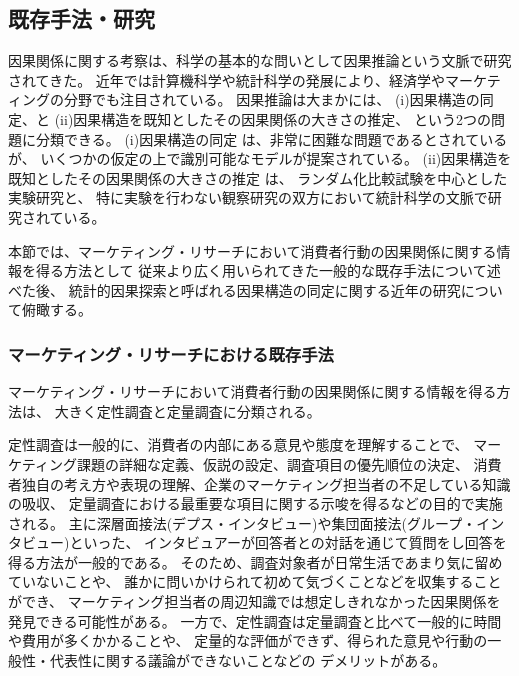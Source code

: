 
\subsection{既存手法・研究}

因果関係に関する考察は、科学の基本的な問いとして因果推論という文脈で研究されてきた。
近年では計算機科学や統計科学の発展により、経済学やマーケティングの分野でも注目されている\cite{Varian2016-se}。
因果推論は大まかには、
(i)因果構造の同定、と
(ii)因果構造を既知としたその因果関係の大きさの推定、
という2つの問題に分類できる。
(i)因果構造の同定 は、非常に困難な問題であるとされているが、
いくつかの仮定の上で識別可能なモデルが提案されている。
(ii)因果構造を既知としたその因果関係の大きさの推定 は、
ランダム化比較試験を中心とした実験研究と、
特に実験を行わない観察研究の双方において統計科学の文脈で研究されている。

本節では、マーケティング・リサーチにおいて消費者行動の因果関係に関する情報を得る方法として
従来より広く用いられてきた一般的な既存手法について述べた後、
統計的因果探索と呼ばれる因果構造の同定に関する近年の研究について俯瞰する。

\subsubsection{マーケティング・リサーチにおける既存手法}

マーケティング・リサーチにおいて消費者行動の因果関係に関する情報を得る方法は、
大きく定性調査と定量調査に分類される。

定性調査は一般的に、消費者の内部にある意見や態度を理解することで、
マーケティング課題の詳細な定義、仮説の設定、調査項目の優先順位の決定、
消費者独自の考え方や表現の理解、企業のマーケティング担当者の不足している知識の吸収、
定量調査における最重要な項目に関する示唆を得るなどの目的で実施される\cite{2018-ci}。
主に深層面接法(デプス・インタビュー)や集団面接法(グループ・インタビュー)といった、
インタビュアーが回答者との対話を通じて質問をし回答を得る方法が一般的である。
そのため、調査対象者が日常生活であまり気に留めていないことや、
誰かに問いかけられて初めて気づくことなどを収集することができ\cite{2018-ci}、
マーケティング担当者の周辺知識では想定しきれなかった因果関係を発見できる可能性がある。
一方で、定性調査は定量調査と比べて一般的に時間や費用が多くかかることや、
定量的な評価ができず、得られた意見や行動の一般性・代表性に関する議論ができないことなどの
デメリットがある。


